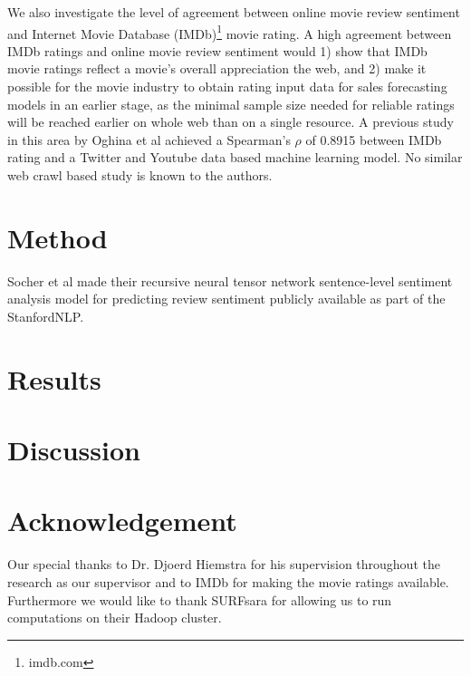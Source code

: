 \documentclass{sig-alternate-br}
\begin{document}
We also investigate the level of agreement between online movie review sentiment and Internet Movie Database (IMDb)\footnote{imdb.com} movie rating. A high agreement between IMDb ratings and online movie review sentiment would 1) show that IMDb movie ratings reflect a movie's overall appreciation the web, and 2) make it possible for the movie industry to obtain rating input data for sales forecasting models in an earlier stage, as the minimal sample size needed for reliable ratings will be reached earlier on whole web than on a single resource. A previous study in this area by Oghina et al \cite{Oghina2012} achieved a Spearman's $\rho$ of 0.8915 between IMDb rating and a Twitter and Youtube data based machine learning model. No similar web crawl based study is known to the authors.

\section{Method}
Socher et al \cite{Socher2013} made their recursive neural tensor network sentence-level sentiment analysis model for predicting review sentiment publicly available as part of the StanfordNLP.

\section{Results}

\section{Discussion}

\section{Acknowledgement}
Our special thanks to Dr. Djoerd Hiemstra for his supervision throughout the research as our supervisor and to IMDb for making the movie ratings available. Furthermore we would like to thank SURFsara for allowing us to run computations on their Hadoop cluster.
%




\balancecolumns

\onecolumn
\end{document}
